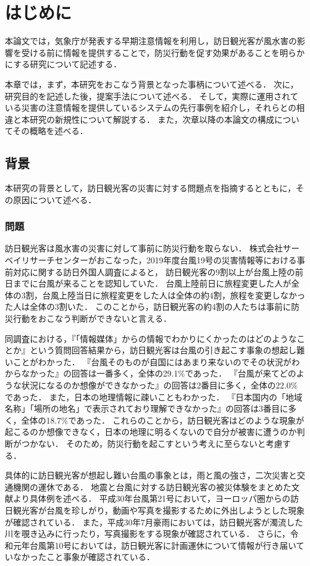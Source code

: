 \documentclass[a4paper,11pt,oneside,openany]{jsbook}
\begin{document}
\chapter{はじめに}
本論文では，気象庁が発表する早期注意情報を利用し，訪日観光客が風水害の影響を受ける前に情報を提供することで，防災行動を促す効果があることを明らかにする研究について記述する．

本章では，まず，本研究をおこなう背景となった事柄について述べる．
次に，研究目的を記述した後，提案手法について述べる．
そして，実際に運用されている災害の注意情報を提供しているシステムの先行事例を紹介し，それらとの相違と本研究の新規性について解説する．
また，次章以降の本論文の構成についてその概略を述べる．

\section{背景}
本研究の背景として，訪日観光客の災害に対する問題点を指摘するとともに，その原因について述べる．

\subsection{問題}
訪日観光客は風水害の災害に対して事前に防災行動を取らない．
株式会社サーベイリサーチセンターがおこなった，2019年度台風19号の災害情報等における事前対応に関する訪日外国人調査\cite{Typhoon}によると，
訪日観光客の9割以上が台風上陸の前日までに台風が来ることを認知していた．
台風上陸前日に旅程変更した人が全体の3割，台風上陸当日に旅程変更をした人は全体の約4割，旅程を変更しなかった人は全体の3割いた．
このことから，訪日観光客の約4割の人たちは事前に防災行動をおこなう判断ができないと言える．

同調査における，『「情報媒体」からの情報でわかりにくかったのはどのようなことか』という質問回答結果から，訪日観光客は台風の引き起こす事象の想起し難いことがわかった．
『台風そのものが自国にはあまり来ないのでその状況がわからなかった』の回答は一番多く，全体の29.1\%であった．
『台風が来てどのような状況になるのか想像ができなかった』の回答は2番目に多く，全体の22.0\%であった．
また，日本の地理情報に疎いこともわかった．
『日本国内の「地域名称」「場所の地名」で表示されており理解できなかった』の回答は3番目に多く，全体の18.7\%であった．
これらのことから，訪日観光客はどのような現象が起こるのか想像できなく，日本の地理に明るくないので自分が被害に遭うのか判断がつかない．
そのため，防災行動を起こすという考えに至らないと考慮する．

具体的に訪日観光客が想起し難い台風の事象とは，雨と風の強さ，二次災害と交通機関の運休である．
地震と台風に対する訪日観光客の被災体験をまとめた文献\cite{1050565163716925056}より具体例を述べる．
平成30年台風第21号において，ヨーロッパ圏からの訪日観光客が台風を珍しがり，動画や写真を撮影するために外出しようとした現象\cite{hounitilabo}が確認されている．
また，平成30年7月豪雨においては，訪日観光客が濁流した川を覗き込みに行ったり，写真撮影をする現象\cite{nihonhousou}が確認されている．
さらに，令和元年台風第10号においては，訪日観光客に計画運休について情報が行き届いていなかったこと事象\cite{nihonkeizaisinbun}が確認されている．
\end{document}
